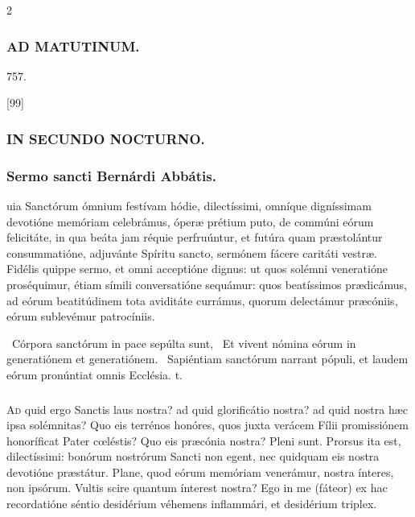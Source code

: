 \documentclass[9pt,twoside]{extarticle}
\begin{document}
\begin{multicols}{2}
\subsubsection*{\center \textsc{AD MATUTINUM.}}
\begin{tightlist}{}
\item {} 757.
\item {} [99]
\item {}
\end{tightlist}

\subsubsection*{\center \textsc{IN SECUNDO NOCTURNO.}}
\subsubsection*{\center Sermo sancti Bernárdi Abbátis.}
\begin{center}\end{center}
uia Sanctórum ómnium festívam hódie, dilectíssimi, omníque digníssimam devotióne memóriam celebrámus, óperæ prétium puto, de commúni eórum felicitáte, in qua beáta jam réquie perfruúntur, et futúra quam præstolántur consummatióne, adjuvánte Spíritu sancto, sermónem fácere caritáti vestræ. Fidélis quippe sermo, et omni acceptióne dignus: ut quos solémni veneratióne proséquimur, étiam símili conversatióne sequámur: quos beatíssimos prædicámus, ad eórum beatitúdinem tota aviditáte currámus, quorum delectámur præcóniis, eórum sublevémur patrocíniis.

\begin{tightlist}{}
\item {}~Córpora sanctórum in pace sepúlta sunt, \textred{*}~Et vivent nómina eórum in generatiónem et generatiónem. ~Sapiéntiam sanctórum narrant pópuli, et laudem eórum pronúntiat omnis Ecclésia. t.
\end{tightlist}


\subsubsection*{\center {}}
\begin{center}\end{center}
\lettrine{A}d quid ergo Sanctis laus nostra? ad quid glorificátio nostra? ad quid nostra hæc ipsa solémnitas? Quo eis terrénos honóres, quos juxta verácem Fílii promissiónem honoríficat Pater cœléstis? Quo eis præcónia nostra? Pleni sunt. Prorsus ita est, dilectíssimi: bonórum nostrórum Sancti non egent, nec quidquam eis nostra devotióne præstátur. Plane, quod eórum memóriam venerámur, nostra ínteres, non ipsórum. Vultis scire quantum ínterest nostra? Ego in me (fáteor) ex hac recordatióne séntio desidérium véhemens inflammári, et desidérium triplex.


\end{multicols}
\end{document}

